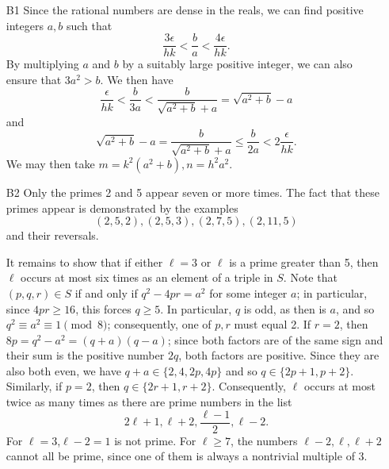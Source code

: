 \documentclass[amssymb,twocolumn,pra,10pt,aps]{revtex4-1}
\begin{document}
\begin{itemize}
\textbf{Remark}.
The matrix $M$ used above has nonnegative entries with row sums equal to 1 (i.e., it corresponds to a Markov chain), and there exists a positive integer $m$ such that $M^m$ has positive entries. For any such matrix,
the Perron-Frobenius theorem implies that
the sequence of vectors $M^m v$ converges to a limit $w$, and there exists $b \in [0,1)$
such that
\[
\limsup_{m \to \infty} \frac{1}{b^{2m}} \sum_{i=1}^n ((M^m v - w)_i)^2
\]
is nonzero and finite. (The intended interpretation in case $b=0$ is that $M^m v = w$ for all large $m$.)
However, the limit need not exist in general.

\item[B1]
Since the rational numbers are dense in the reals, we can find positive integers $a,b$
such that
\[
\frac{3\epsilon}{hk} < \frac{b}{a}
< \frac{4\epsilon}{hk}.
\]
By multiplying $a$ and $b$ by a suitably large positive integer, we can also ensure that $3a^2 > b$. We then have
\[
\frac{\epsilon}{hk} < \frac{b}{3a} < \frac{b}{\sqrt{a^2+b} + a} = \sqrt{a^2+b} - a
\]
and
\[
\sqrt{a^2+b} - a = \frac{b}{\sqrt{a^2+b} + a} \leq \frac{b}{2a} < 2 \frac{\epsilon}{hk}.
\]
We may then take $m = k^2 (a^2+b), n = h^2 a^2$.

\item[B2]
Only the primes 2 and 5 appear seven or more times.
The fact that these primes appear is demonstrated by the examples
\[
(2,5,2), (2, 5, 3),  (2, 7, 5), (2, 11, 5)
\]
and their reversals.

It remains to show that if either $\ell=3$ or $\ell$ is a prime greater than 5, then $\ell$ occurs at most six times
as an element of a triple in $S$.
Note that $(p,q,r) \in S$ if and only if
$q^2 - 4pr = a^2$ for some integer $a$; in particular, since $4pr \geq 16$, this forces $q \geq 5$.
In particular, $q$ is odd, as then is $a$, and so $q^2 \equiv a^2 \equiv 1 \pmod{8}$;
consequently, one of $p,r$ must equal 2. If $r=2$, then $8p = q^2-a^2 = (q+a)(q-a)$; since both factors
are of the same sign and their sum is the positive number $2q$, both factors are positive.
Since they are also both even, we have $q+a \in \{2, 4, 2p, 4p\}$ and so
$q \in \{2p+1, p+2\}$. Similarly, if $p=2$, then $q \in \{2r+1, r+2\}$.
Consequently, $\ell$ occurs at most twice as many times as there are prime numbers in the list
\[
2\ell+1, \ell+2, \frac{\ell-1}{2}, \ell-2.
\]
For $\ell = 3$,$\ell-2= 1$ is not prime.
For $\ell \geq 7$, the numbers $\ell-2, \ell, \ell+2$ cannot all be prime,
since one of them is always a nontrivial multiple of 3.


\end{itemize}
\end{document}
